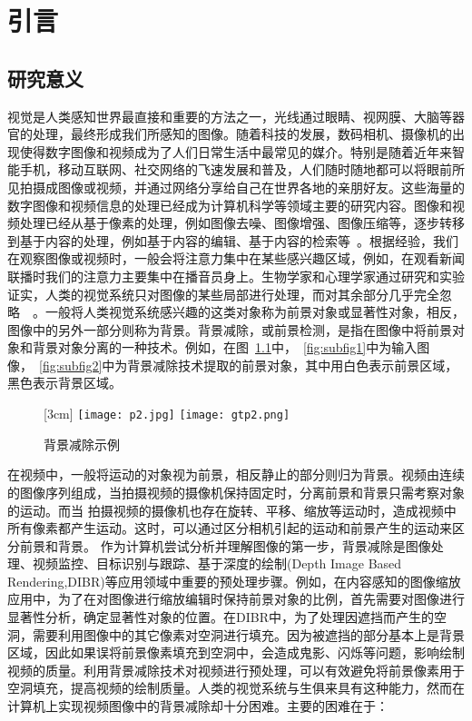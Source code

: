 \chapter{引言}
\label{cha:intro}

\section{研究意义}
\label{sec:first}
视觉是人类感知世界最直接和重要的方法之一，光线通过眼睛、视网膜、大脑等器官的处理，最终形成我们所感知的图像。随着科技的发展，数码相机、摄像机的出现使得数字图像和视频成为了人们日常生活中最常见的媒介。特别是随着近年来智能手机，移动互联网、社交网络的飞速发展和普及，人们随时随地都可以将眼前所见拍摄成图像或视频，并通过网络分享给自己在世界各地的亲朋好友。这些海量的数字图像和视频信息的处理已经成为计算机科学等领域主要的研究内容。图像和视频处理已经从基于像素的处理，例如图像去噪、图像增强、图像压缩等，逐步转移到基于内容的处理，例如基于内容的编辑、基于内容的检索等~\cite{CMM12THU}。根据经验，我们在观察图像或视频时，一般会将注意力集中在某些感兴趣区域，例如，在观看新闻联播时我们的注意力主要集中在播音员身上。生物学家和心理学家通过研究和实验证实，人类的视觉系统只对图像的某些局部进行处理，而对其余部分几乎完全忽略~\cite{treisman1980a}~\cite{Koch1985Shifts}。一般将人类视觉系统感兴趣的这类对象称为前景对象或显著性对象，相反，图像中的另外一部分则称为背景。背景减除，或前景检测，是指在图像中将前景对象和背景对象分离的一种技术。例如，在图~\ref{fig:1}中，~\ref{fig:subfig1}中为输入图像，~\ref{fig:subfig2}中为背景减除技术提取的前景对象，其中用白色表示前景区域，黑色表示背景区域。\par
\begin{figure}[h]
  \centering%
  [3cm] %
    {\texttt{[image: p2.jpg]}}%
  \hspace{4em}%
      {\texttt{[image: gtp2.png]}}
  \caption{背景减除示例}
  \label{fig:1}
\end{figure}
在视频中，一般将运动的对象视为前景，相反静止的部分则归为背景。视频由连续的图像序列组成，当拍摄视频的摄像机保持固定时，分离前景和背景只需考察对象的运动。而当
拍摄视频的摄像机也存在旋转、平移、缩放等运动时，造成视频中所有像素都产生运动。这时，可以通过区分相机引起的运动和前景产生的运动来区分前景和背景。
作为计算机尝试分析并理解图像的第一步，背景减除是图像处理、视频监控、目标识别与跟踪、基于深度的绘制(Depth Image Based Rendering,DIBR)等应用领域中重要的预处理步骤。例如，在内容感知的图像缩放应用中，为了在对图像进行缩放编辑时保持前景对象的比例，首先需要对图像进行显著性分析，确定显著性对象的位置。在DIBR中，为了处理因遮挡而产生的空洞，需要利用图像中的其它像素对空洞进行填充。因为被遮挡的部分基本上是背景区域，因此如果误将前景像素填充到空洞中，会造成鬼影、闪烁等问题，影响绘制视频的质量。利用背景减除技术对视频进行预处理，可以有效避免将前景像素用于空洞填充，提高视频的绘制质量。人类的视觉系统与生俱来具有这种能力，然而在计算机上实现视频图像中的背景减除却十分困难。主要的困难在于：
